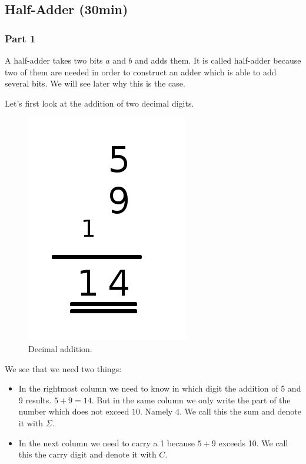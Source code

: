 \documentclass[10pt,a4paper]{article}
\begin{document}
\subsection{Half-Adder (30min)}
\subsubsection{Part 1}
A half-adder takes two bits $a$ and $b$ and adds them. It is called half-adder because two of them are needed in order to construct an adder which is able to add several bits. We will see later why this is the case.

Let's first look at the addition of two decimal digits. 

\begin{figure}[h]
	\centering		  
	\includegraphics[scale=0.3]{decimal_addition.png}
	\caption{Decimal addition.}
	\label{fig:decimal_addition}
\end{figure}
We see that we need two things:
\begin{itemize}
	\item In the rightmost column we need to know in which digit the addition of 5 and 9 results. $5+9=14$. But in the same column we only write the part of the number which does not exceed $10$. Namely $4$. We call this the sum and denote it with $\Sigma$.
	\item In the next column we need to carry a 1 because $5+9$ exceeds 10. We call this the carry digit and denote it with $C$.
\end{itemize}
\end{document}
